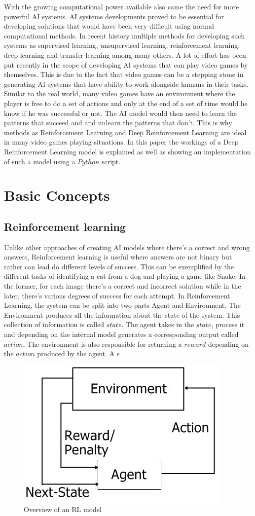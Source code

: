 \documentclass[conference]{IEEEtran}
\begin{document}
With the growing computational power available also came the need for more powerful AI systems. AI systems developments proved to be essential for developing solutions that would have been very difficult using normal computational methods. In recent history multiple methods for developing such systems as supervised learning, unsupervised learning, reinforcement learning, deep learning and transfer learning among many others. A lot of effort has been put recently in the scope of developing AI systems that can play video games by themselves. This is due to the fact that video games can be a stepping stone in generating AI systems that have ability to work alongside humans in their tasks. Similar to the real world, many video games have an environment where the player is free to do a set of actions and only at the end of a set of time would he know if he was successful or not. The AI model would then need to learn the patterns that succeed and and unlearn the patterns that don't. This is why methods as Reinforcement Learning and Deep Reinforcement Learning are ideal in many video games playing situations. In this paper the workings of a Deep Reinforcement Learning model is explained as well as showing an implementation of such a model using a $Python$ script.
\section{Basic Concepts}
\subsection{Reinforcement learning}
Unlike other approaches of creating AI models where there's a correct and wrong answers, Reinforcement learning is useful where answers are not binary but rather can lead do different levels of success. This can be exemplified by the different tasks of identifying a cat from a dog and playing a game like Snake. In the former, for each image there's a correct and incorrect solution while in the later, there's various degrees of success for each attempt. In Reinforcement Learning, the system can be split into two parts Agent and Environment. The Environment produces all the information about the state of the system. This collection of information is called $state$. The agent takes in the $state$, process it and depending on the internal model generates a corresponding output called $action$, The environment is also responsible for returning a $reward$ depending on the $action$ produced by the agent. A s
\begin{figure}
    \centering
    \includegraphics[width=0.5\linewidth]{Reinforcement-Learning-block-diagram.png}
    \caption{Overview of an RL model\cite{inproceedings}}
    \label{fig:RL}
\end{figure}
\end{document}
